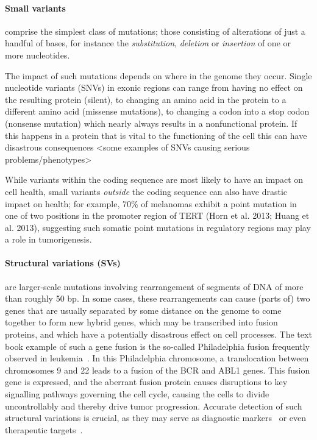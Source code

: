 \begin{justify}
\paragraph{Small variants} comprise the simplest class of mutations; those consisting of alterations of just a handful of bases, for instance the \emph{substitution}, \emph{deletion} or \emph{insertion} of one or more nucleotides.

The impact of such mutations depends on where in the genome they occur. Single nucleotide variants (SNVs) in exonic regions can range from having no effect on the resulting protein (silent), to changing an amino acid in the protein to a different amino acid (missense mutations), to changing a codon into a stop codon (nonsense mutation) which nearly always results in a nonfunctional protein. If this happens in a protein that is vital to the functioning of the cell this can have disastrous consequences <some examples of SNVs causing serious problems/phenotypes>

While variants within the coding sequence are most likely to have an impact on cell health, small variants \emph{outside} the coding sequence can also have drastic impact on health; for example, 70\% of melanomas exhibit a point mutation in one of two positions in the promoter region of TERT (Horn et al. 2013; Huang et al. 2013), suggesting such somatic point mutations in regulatory regions may play a role in tumorigenesis.

\paragraph{Structural variations (SVs)} are larger-scale mutations involving rearrangement of segments of DNA of more than roughly 50 bp. In some cases, these rearrangements can cause (parts of) two genes that are usually separated by some distance on the genome to come together to form new hybrid genes, which may be transcribed into fusion proteins, and which have a potentially disastrous effect on cell processes. The text book example of such a gene fusion is the so-called Philadelphia fusion frequently observed in leukemia~\cite{TODO}. In this Philadelphia chromosome, a translocation between chromosomes 9 and 22 leads to a fusion of the BCR and ABL1 genes. This fusion gene is expressed, and the aberrant fusion protein causes disruptions to key signalling pathways governing the cell cycle, causing the cells to divide uncontrollably and thereby drive tumor progression. Accurate detection of such structural variations is crucial, as they may serve as diagnostic markers~\cite{nowell1960chromosome,nowell1961chromosome} or even therapeutic targets~\cite{druker2001activity, druker2001efficacy}.


\end{justify}
